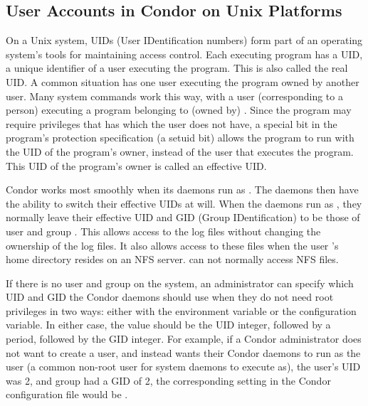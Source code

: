 \subsection{\label{sec:uids}User Accounts in Condor on Unix Platforms}


On a Unix system,
UIDs (User IDentification numbers) form part of an operating system's
tools for maintaining access control.
Each executing program has a UID,
a unique identifier of a user executing the program.
This is also called the real UID.
A common situation has one user executing the program owned
by another user.
Many system commands work this way, with a user (corresponding
to a person) executing a program belonging to (owned by) .
Since the program may require privileges that  has which
the user does not have, a special bit in the program's
protection specification (a setuid bit) allows the program
to run with the UID of the program's owner, instead of the
user that executes the program.
This UID of the program's owner is called an effective UID.

Condor works most smoothly when its daemons run as .
The daemons then have the ability to switch their 
effective UIDs at will.
When the daemons run as ,
they normally leave their effective UID and GID (Group IDentification)
to be those of user and group .
This allows access to the log files without
changing the ownership of the log files.
It also allows access to these files when
the user 's home directory resides on an NFS server.
 can not normally access NFS files.

If there is no  user and group on the system, an
administrator can specify which UID and GID the Condor daemons should
use when they do not need root privileges in two ways:
either with the  environment variable or the
 configuration variable.
In either case, the value should be the UID integer, followed by a
period, followed by the GID integer.
For example, if a Condor administrator does not want to create a
 user, and instead wants their Condor daemons to run as
the  user (a common non-root user for system daemons to
execute as), the  user's UID was 2, and group
 had a GID of 2, the corresponding setting in the Condor
configuration file would be .

